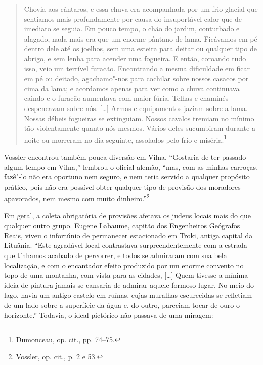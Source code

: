 \begin{quote}
Chovia aos cântaros, e essa chuva era acompanhada por um frio glacial
que sentíamos mais profundamente por causa do insuportável calor que de
imediato se seguia. Em pouco tempo, o chão do jardim, conturbado e
alagado, nada mais era que um enorme pântano de lama. Ficávamos em pé
dentro dele até os joelhos, sem uma esteira para deitar ou qualquer tipo
de abrigo, e sem lenha para acender uma fogueira. E então, coroando tudo
isso, veio um terrível furacão. Encontrando a mesma dificuldade em ficar
em pé ou deitado, agachamo"-nos para cochilar sobre nossos casacos por
cima da lama; e acordamos apenas para ver como a chuva continuava caindo
e o furacão aumentava com maior fúria. Telhas e chaminés despencavam
sobre nós. [\ldots{}] Armas e equipamentos jaziam sobre a lama. Nossas
débeis fogueiras se extinguiam. Nossos cavalos tremiam no mínimo tão
violentamente quanto nós mesmos. Vários deles sucumbiram durante a noite
ou morreram no dia seguinte, assolados pelo frio e miséria.\footnote{Dumonceau, op. cit., pp. 74--75.} 
\end{quote}

Vossler encontrou também pouca diversão em Vilna. ``Gostaria de ter
passado algum tempo em Vilna,'' lembrou o oficial alemão, ``mas, com as
minhas carroças, fazê"-lo não era oportuno nem seguro, e nem teria
servido a qualquer propósito prático, pois não era possível obter
qualquer tipo de provisão dos moradores apavorados, nem mesmo com muito
dinheiro.''\footnote{Vossler, op. cit., p. 2 e 53.}

Em geral, a coleta obrigatória de provisões afetava os judeus locais
mais do que qualquer outro grupo. Eugene Labaume, capitão dos
Engenheiros Geógrafos Reais, viveu o infortúnio de permanecer
estacionado em Troki, antiga capital da Lituânia. ``Este agradável local
contrastava surpreendentemente com a estrada que tínhamos acabado de
percorrer, e todos se admiraram com sua bela localização, e com o
encantador efeito produzido por um enorme convento no topo de uma
montanha, com vista para as cidades, [\ldots{}] Quem tivesse a mínima
ideia de pintura jamais se cansaria de admirar aquele formoso lugar. No
meio do lago, havia um antigo castelo em ruínas, cujas muralhas
escurecidas se refletiam de um lado sobre a superfície da água e, do
outro, pareciam tocar de ouro o horizonte.'' Todavia, o ideal pictórico
não passava de uma miragem:


